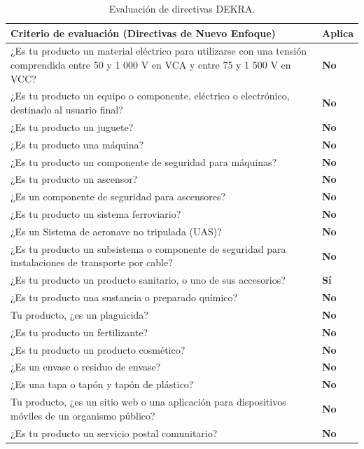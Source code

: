 \documentclass[11pt,a4paper]{article}
\begin{document}
\begin{table}[H]
    
\noindent
{\renewcommand{\tabularxcolumn}[1]{m{#1}} %
\renewcommand{\arraystretch}{1.5}
\begin{tabularx}{\textwidth}{|>{\columncolor{gray!15}\centering\arraybackslash\small}X|>{\centering\arraybackslash\bfseries}m{2.5cm}|}
\hline
\rowcolor{ArthroNavy}
\color{white}\textbf{Criterio de evaluación (Directivas de Nuevo Enfoque)} & \color{white}\textbf{Aplica} \\
\hline
¿Es tu producto un material eléctrico para utilizarse con una tensión comprendida entre 50 y 1 000 V en VCA y entre 75 y 1 500 V en VCC? & No \\ \hline
¿Es tu producto un equipo o componente, eléctrico o electrónico, destinado al usuario final? & No \\ \hline
¿Es tu producto un juguete? & No \\ \hline
¿Es tu producto una máquina? & No \\ \hline
¿Es tu producto un componente de seguridad para máquinas? & No \\ \hline
¿Es tu producto un ascensor? & No \\ \hline
¿Es un componente de seguridad para ascensores? & No \\ \hline
¿Es tu producto un sistema ferroviario? & No \\ \hline
¿Es un Sistema de aeronave no tripulada (UAS)? & No \\ \hline
¿Es tu producto un subsistema o componente de seguridad para instalaciones de transporte por cable? & No \\ \hline
\rowcolor{ArthroTeal!10} %
¿Es tu producto un producto sanitario, o uno de sus accesorios? & \textcolor{ArthroTeal}{Sí} \\ \hline
¿Es tu producto una sustancia o preparado químico? & No \\ \hline
Tu producto, ¿es un plaguicida? & No \\ \hline
¿Es tu producto un fertilizante? & No \\ \hline
¿Es tu producto un producto cosmético? & No \\ \hline
¿Es un envase o residuo de envase? & No \\ \hline
¿Es una tapa o tapón y tapón de plástico? & No \\ \hline
Tu producto, ¿es un sitio web o una aplicación para dispositivos móviles de un organismo público? & No \\ \hline
¿Es tu producto un servicio postal comunitario? & No \\ \hline
\end{tabularx}}
\centering
    \caption{Evaluación de directivas DEKRA.}
    \label{tab:evaluacion_dekra}
    \vspace{0.3cm} %
\end{table}
\vspace{0.8cm}
\end{document}
